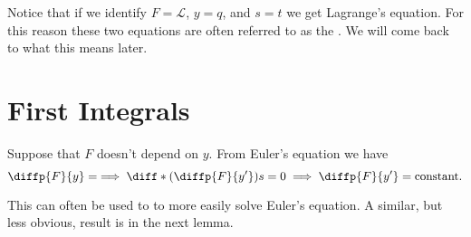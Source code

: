 \documentclass[fleqn]{NotesClass}
\newcommand*{\lagrangian}{\mathcal{L}}
\begin{document}
    Notice that if we identify \(F = \lagrangian\), \(y = q\), and \(s = t\) we get Lagrange's equation.
    For this reason these two equations are often referred to as the .
    We will come back to what this means later.
    
    \section{First Integrals}
    Suppose that \(F\) doesn't depend on \(y\).
    From Euler's equation we have
    \begin{equation}
        \diffp{F}{y} = \implies \diff*{\left( \diffp{F}{y'} \right)}{s} = 0 \implies \diffp{F}{y'} = \text{constant.}
    \end{equation}
    
    This can often be used to to more easily solve Euler's equation.
    A similar, but less obvious, result is in the next lemma.
    
\end{document}
